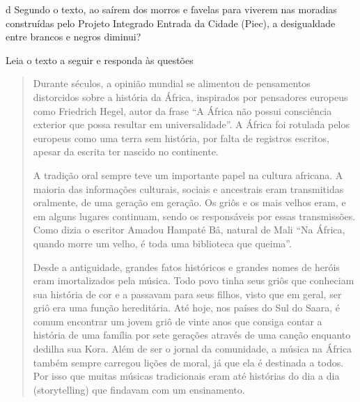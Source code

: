 \num{d} Segundo o texto, ao saírem dos morros e favelas para viverem nas
moradias construídas pelo Projeto Integrado Entrada da Cidade (Piec), a
desigualdade entre brancos e negros diminui?




Leia o texto a seguir e responda às questões


\begin{quote}
Durante séculos, a opinião mundial se alimentou de pensamentos
distorcidos sobre a história da África, inspirados por pensadores
europeus como Friedrich Hegel, autor da frase ``A África não possui
consciência exterior que possa resultar em universalidade''. A África
foi rotulada pelos europeus como uma terra sem história, por falta de
registros escritos, apesar da escrita ter nascido no continente.

A tradição oral sempre teve um importante papel na cultura africana. A
maioria das informações culturais, sociais e ancestrais eram
transmitidas oralmente, de uma geração em geração. Os griôs e os mais
velhos eram, e em alguns lugares continuam, sendo os responsáveis por
essas transmissões. Como dizia o escritor Amadou Hampaté Bâ, natural de
Mali ``Na África, quando morre um velho, é toda uma biblioteca que
queima''.

Desde a antiguidade, grandes fatos históricos e grandes nomes de heróis
eram imortalizados pela música. Todo povo tinha seus griôs que conheciam
sua história de cor e a passavam para seus filhos, visto que em geral,
ser griô era uma função hereditária. Até hoje, nos países do Sul do
Saara, é comum encontrar um jovem griô de vinte anos que consiga contar
a história de uma família por sete gerações através de uma canção
enquanto dedilha sua Kora. Além de ser o jornal da comunidade, a música
na África também sempre carregou lições de moral, já que ela é destinada
a todos. Por isso que muitas músicas tradicionais eram até histórias do
dia a dia (storytelling) que findavam com um ensinamento.
\end{quote}

